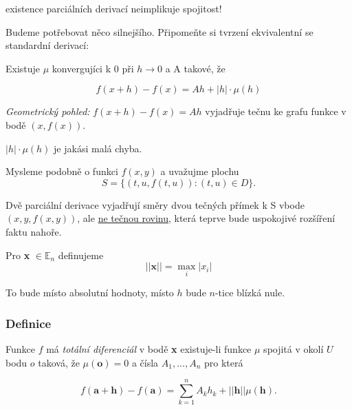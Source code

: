 \documentclass[10pt]{article}
\begin{document}
\begin{center}
    existence parciálních derivací neimplikuje spojitost!
\end{center}

\hspace{1.2mm}
Budeme potřebovat něco silnejšího. Připomeňte si tvrzení ekvivalentní se standardní derivací:

Existuje $\mu$ konvergujíci k 0 při $h \rightarrow 0$ a A takové, že 

\[f(x+h) - f(x) = Ah + |h| \cdot \mu(h)\]

\hspace{1.2mm}
\textit{Geometrický pohled:}
$f(x+h) - f(x) = Ah$ vyjadřuje tečnu ke grafu funkce v bodě $(x,f(x)).$

\hspace{1.2mm}
$|h|\cdot \mu(h)$ je jakási malá chyba.
\noindent

\hspace{1.2mm}
Mysleme podobně o funkci $f(x,y)$ a uvažujme plochu 
\[S = \{(t,u,f(t,u)) : (t,u) \in D\}.\]

\hspace{1.2mm}
Dvě parciální derivace vyjadřují směry dvou tečných přímek k S vbode $(x,y,f(x,y))$, ale \underline{ne tečnou rovinu}, 
která teprve bude uspokojivé rozšíření faktu nahoře.


\hspace{1.2mm}
Pro \textbf{x} $\in \mathbb{E}_n$ definujeme
\[||\textbf{x}||  = \max_i|x_i|\]

\hspace{1.2mm}
To bude místo absolutní hodnoty, místo $h$ bude $n$-tice blízká nule.
\noindent

\subsubsection{Definice}
Funkce $f$ má \textit{totální diferenciál} v bodě \textbf{x} existuje-li funkce $\mu$ spojitá v okolí $U$ bodu $o$ taková, že $\mu(\textbf{o}) = 0$
a čísla $A_1,...,A_n$ pro která

\[f(\textbf{a}+\textbf{h}) - f(\textbf{a}) = \sum^n_{k=1}A_kh_k+||\textbf{h}||\mu(\textbf{h}).\]
\hspace{1.2mm}
\noindent

\end{document}
